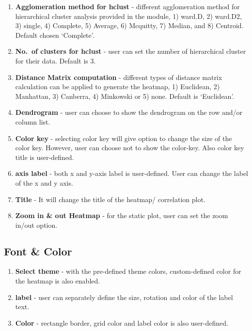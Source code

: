 \documentclass[
  a4paper,
  oneside,
  open=any]{scrreport}
\providecommand{\tightlist}{%
  \setlength{\itemsep}{0pt}\setlength{\parskip}{0pt}}\usepackage{longtable,booktabs,array}
\begin{document}
\begin{enumerate}
\def\labelenumi{\arabic{enumi}.}
\setcounter{enumi}{2}
\tightlist
\item
  \textbf{Agglomeration method for hclust} - different agglomeration
  method for hierarchical cluster analysis provided in the module, 1)
  ward.D, 2) ward.D2, 3) single, 4) Complete, 5) Average, 6) Mcquitty,
  7) Median, and 8) Centroid. Default chosen `Complete'.
\item
  \textbf{No.~of clusters for hclust} - user can set the number of
  hierarchical cluster for their data. Default is 3.
\item
  \textbf{Distance Matrix computation} - different types of distance
  matrix calculation can be applied to generate the heatmap, 1)
  Euclidean, 2) Manhattan, 3) Canberra, 4) Minkowski or 5) none. Default
  is `Euclidean'.
\item
  \textbf{Dendrogram} - user can choose to show the dendrogram on the
  row and/or column list.
\item
  \textbf{Color key} - selecting color key will give option to change
  the size of the color key. However, user can choose not to show the
  color-key. Also color key title is user-defined.
\item
  \textbf{axis label} - both x and y-axis label is user-defined. User
  can change the label of the x and y axis.
\item
  \textbf{Title} - It will change the title of the heatmap/ correlation
  plot.
\item
  \textbf{Zoom in \& out Heatmap} - for the static plot, user can set
  the zoom in/out option.
\end{enumerate}

\hypertarget{font-color}{%
\subsection{Font \& Color}\label{font-color}}

\begin{enumerate}
\def\labelenumi{\arabic{enumi}.}
\tightlist
\item
  \textbf{Select theme} - with the pre-defined theme colors,
  custom-defined color for the heatmap is also enabled.
\item
  \textbf{label} - user can separately define the size, rotation and
  color of the label text.
\item
  \textbf{Color} - rectangle border, grid color and label color is also
  user-defined.
\end{enumerate}
\end{document}
